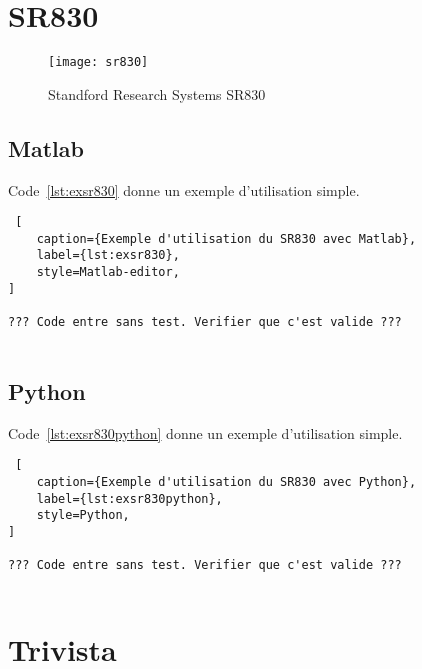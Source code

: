 \documentclass[11pt,francais]{book} %
\begin{document}

\section{SR830}

\begin{figure}[htbp]
\centering\texttt{[image: sr830]}
\caption{Standford Research Systems SR830}
\label{fig:sr830}
\end{figure}

\subsection{Matlab}

Code~\ref{lst:exsr830} donne un exemple d'utilisation simple.

\begin{lstlisting} [
    caption={Exemple d'utilisation du SR830 avec Matlab},
    label={lst:exsr830},
    style=Matlab-editor,
]

??? Code entre sans test. Verifier que c'est valide ???
  
\end{lstlisting}

\subsection{Python}

Code~\ref{lst:exsr830python} donne un exemple d'utilisation simple.

\begin{lstlisting} [
    caption={Exemple d'utilisation du SR830 avec Python},
    label={lst:exsr830python},
    style=Python,
]

??? Code entre sans test. Verifier que c'est valide ???
  
\end{lstlisting}


\section{Trivista}
\end{document}
